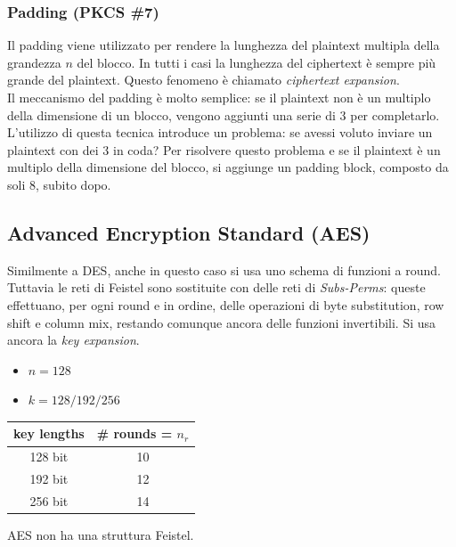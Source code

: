 \documentclass[a4paper,12pt]{article}
\begin{document}
\subsubsection{Padding (PKCS \#7)}
Il padding viene utilizzato per rendere la lunghezza del plaintext multipla della grandezza $n$ del blocco. 
In tutti i casi la lunghezza del ciphertext è sempre più grande del plaintext. Questo fenomeno è chiamato \textit{ciphertext expansion}. \\
Il meccanismo del padding è molto semplice: se il plaintext non è un multiplo della dimensione di un blocco, vengono aggiunti una serie di $3$ per completarlo. \\
L'utilizzo di questa tecnica introduce un problema: se avessi voluto inviare un plaintext con dei $3$ in coda? Per risolvere questo problema e se il plaintext è un multiplo della dimensione del blocco, si aggiunge un padding block, composto da soli 8, subito dopo.

\subsection{Advanced Encryption Standard (AES)}
Similmente a DES, anche in questo caso si usa uno schema di funzioni a round.
Tuttavia le reti di Feistel sono sostituite con delle reti di \textit{Subs-Perms}: queste effettuano, per ogni round e in ordine, delle operazioni di byte substitution, row shift e column mix, restando comunque ancora delle funzioni invertibili. 
Si usa ancora la \textit{key expansion}.
\begin{itemize}
	\item $n = 128$
	\item $k = 128/192/256$
\end{itemize}

\begin{center}
\begin{tabular}{ c | c }
key lengths & \# rounds = $n_r$ \\
\hline
128 bit & 10 \\ 
192 bit & 12 \\  
256 bit & 14    
\end{tabular}
\end{center}
AES non ha una struttura Feistel.
\end{document}
